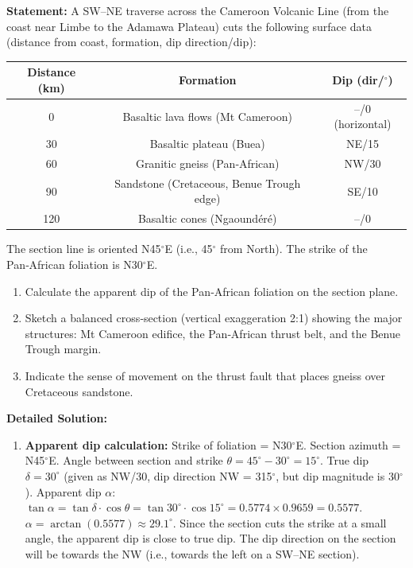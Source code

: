 \documentclass[11pt]{article}
\begin{document}
\begin{exoresolu}
\textbf{Statement:} A SW–NE traverse across the Cameroon Volcanic Line (from the coast near Limbe to the Adamawa Plateau) cuts the following surface data (distance from coast, formation, dip direction/dip):
\begin{center}
\begin{tabular}{|c|c|c|}\hline
Distance (km) & Formation & Dip (dir/$^\circ$)\\\hline
0 & Basaltic lava flows (Mt Cameroon) & –/0 (horizontal)\\\hline
30 & Basaltic plateau (Buea) & NE/15\\\hline
60 & Granitic gneiss (Pan‑African) & NW/30\\\hline
90 & Sandstone (Cretaceous, Benue Trough edge) & SE/10\\\hline
120 & Basaltic cones (Ngaoundéré) & –/0\\\hline
\end{tabular}
\end{center}
The section line is oriented N45$^\circ$E (i.e., 45$^\circ$ from North). The strike of the Pan‑African foliation is N30$^\circ$E. 
\begin{enumerate}
\item Calculate the apparent dip of the Pan‑African foliation on the section plane.
\item Sketch a balanced cross‑section (vertical exaggeration 2:1) showing the major structures: Mt Cameroon edifice, the Pan‑African thrust belt, and the Benue Trough margin.
\item Indicate the sense of movement on the thrust fault that places gneiss over Cretaceous sandstone.
\end{enumerate}
\tcblower
\textbf{Detailed Solution:}
\begin{enumerate}
\item \textbf{Apparent dip calculation:} 
Strike of foliation = N30$^\circ$E. Section azimuth = N45$^\circ$E. Angle between section and strike $\theta = 45^\circ - 30^\circ = 15^\circ$.
True dip $\delta = 30^\circ$ (given as NW/30, dip direction NW = 315$^\circ$, but dip magnitude is 30$^\circ$).
Apparent dip $\alpha$: $\tan\alpha = \tan\delta \cdot \cos\theta = \tan30^\circ \cdot \cos15^\circ = 0.5774 \times 0.9659 = 0.5577$.
$\alpha = \arctan(0.5577) \approx 29.1^\circ$.
Since the section cuts the strike at a small angle, the apparent dip is close to true dip. The dip direction on the section will be towards the NW (i.e., towards the left on a SW–NE section).

\end{enumerate}
\end{exoresolu}
\end{document}
